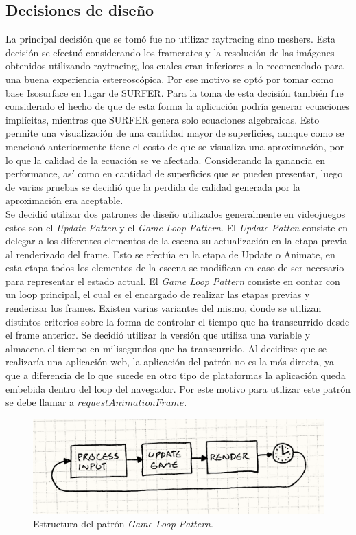 \documentclass[12pt]{article}
\begin{document}
\subsection{Decisiones de diseño}
La principal decisión que se tomó fue no utilizar raytracing sino meshers. Esta decisión se efectuó considerando los framerates y la resolución de las imágenes obtenidos utilizando raytracing, los cuales eran inferiores a lo recomendado para una buena experiencia estereoscópica. Por ese motivo se optó por tomar como base Isosurface en lugar de SURFER. Para la toma de esta decisión también fue considerado el hecho de que de esta forma la aplicación podría generar ecuaciones implícitas, mientras que SURFER genera solo ecuaciones algebraicas. Esto permite una visualización de una cantidad mayor de superficies, aunque como se mencionó anteriormente tiene el costo de que se visualiza una aproximación, por lo que la calidad de la ecuación se ve afectada. Considerando la ganancia en performance, así como en cantidad de superficies que se pueden presentar, luego de varias pruebas se decidió que la perdida de calidad generada por la aproximación era aceptable.
\\Se decidió utilizar dos patrones de diseño utilizados generalmente en videojuegos estos son el \textit{Update Patten} y el \textit{Game Loop Pattern}\cite{patterns}\cite{engine}. El \textit{Update Patten} consiste en delegar a los diferentes elementos de la escena su actualización en la etapa previa al renderizado del frame. Esto se efectúa en la etapa de Update o Animate, en esta etapa todos los elementos de la escena se modifican en caso de ser necesario para representar el estado actual. El \textit{Game Loop Pattern} consiste en contar con un loop principal, el cual es el encargado de realizar las etapas previas y renderizar los frames. Existen varias variantes del mismo\cite{patterns}, donde se utilizan distintos criterios sobre la forma de controlar el tiempo que ha transcurrido desde el frame anterior. Se decidió utilizar la versión que utiliza una variable y almacena el tiempo en milisegundos que ha transcurrido. Al decidirse que se realizaría una aplicación web, la aplicación del patrón no es la más directa, ya que a diferencia de lo que sucede en otro tipo de plataformas la aplicación queda embebida dentro del loop del navegador. Por este motivo para utilizar este patrón se debe llamar a $requestAnimationFrame$\cite{patterns}.
\begin{figure}[h]
\includegraphics[width =0.7\linewidth, center]{gameloop.png}
\caption{Estructura del patrón \textit{Game Loop Pattern}\cite{patterns}.}
\label{ fig : surface }
\end{figure}
\end{document}
